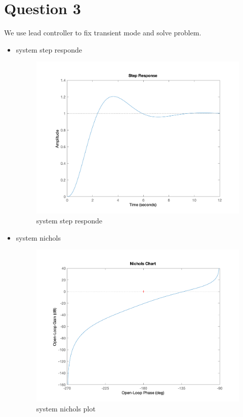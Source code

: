 \section{Question 3}
We use lead controller to fix transient mode and solve problem.
\newpage
\begin{itemize}
    \item system step responde
    \begin{figure}[H]
        \caption{system step responde}
        \centering
        \includegraphics[width=12cm]{../Figure/Q3/Q3_system_respond.png}
    \end{figure}
    \item system nichols
    \begin{figure}[H]
        \caption{system nichols plot}
        \centering
        \includegraphics[width=12cm]{../Figure/Q3/Q3_system_nichols.png}
    \end{figure}

\end{itemize}
